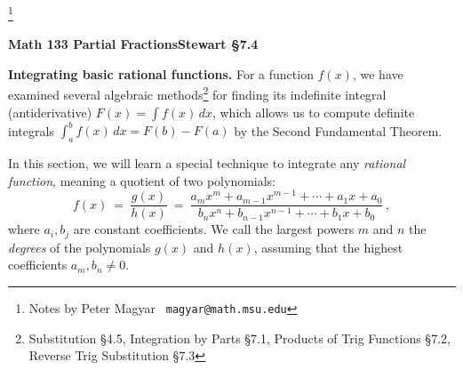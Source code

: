 \documentclass[11pt]{article}
\begin{document}
\footnote[0]{Notes by Peter Magyar \ {\tt magyar@math.msu.edu}}
\vspace{-1em}

\centerline{\bf Math 133\hspace{1.5em} \hfill{\Large\bf
Partial Fractions}\hfill Stewart \S7.4}
\vspace{1em}

\noindent 
{\bf Integrating basic rational functions.}
For a function $f(x)$, we have examined several algebraic methods\footnote{
Substitution \S4.5, Integration by Parts \S7.1, Products of Trig Functions \S7.2, Reverse Trig Substitution \S7.3
}
for finding its indefinite integral (antiderivative) $F(x)=\int f(x)\,dx$, 
which allows us to compute definite integrals $\int_a^b f(x)\,dx=F(b)-F(a)$ by the Second Fundamental Theorem. 

In this section, we will learn a special technique to integrate any {\it rational function},
meaning a quotient of two polynomials:
$$
f(x) \ =\ \frac{g(x)}{h(x)}
\ =\ 
\frac{a_mx^m + a_{m-1}x^{m-1} + \cdots + a_1x + a_0}
{b_nx^n + b_{n-1}x^{n-1} + \cdots + b_1x + b_0}\,,
$$
where $a_i, b_j$ are constant coefficients. 
We call the largest powers $m$ and $n$ the {\it degrees} of the polynomials $g(x)$ and $h(x)$, assuming that the highest coefficients $a_m,b_n\neq 0$.
\end{document}
